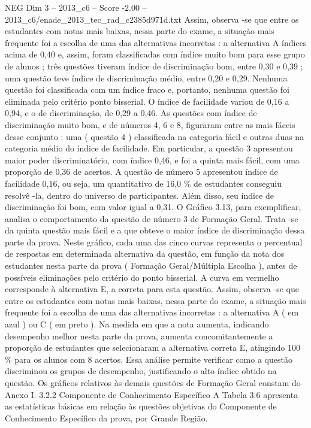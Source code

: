 \begin{textsample}{NEG Dim 3 – 2013\_c6 – Score -2.00 – 2013\_c6/enade\_2013\_tec\_rad\_c2385d971d.txt}
Assim, observa -se que entre os estudantes com notas mais baixas, nessa parte do exame, a situação mais frequente foi a escolha de uma das alternativas incorretas : a alternativa A índices acima de 0,40 e, assim, foram classificadas com índice muito bom para esse grupo de alunos ; três questões tiveram índice de discriminação bom, entre 0,30 e 0,39 ; uma questão teve índice de discriminação médio, entre 0,20 e 0,29.
Nenhuma questão foi classificada com um índice fraco e, portanto, nenhuma questão foi eliminada pelo critério ponto bisserial.
O índice de facilidade variou de 0,16 a 0,94, e o de discriminação, de 0,29 a 0,46.
As questões com índice de discriminação muito bom, e de números 4, 6 e 8, figuraram entre as mais fáceis desse conjunto : uma ( questão 4 ) classificada na categoria fácil e outras duas na categoria médio do índice de facilidade.
Em particular, a questão 3 apresentou maior poder discriminatório, com índice 0,46, e foi a quinta mais fácil, com uma proporção de 0,36 de acertos.
A questão de número 5 apresentou índice de facilidade 0,16, ou seja, um quantitativo de 16,0 \% de estudantes conseguiu resolvê -la, dentro do universo de participantes.
Além disso, seu índice de discriminação foi bom, com valor igual a 0,31.
O Gráfico 3.13, para exemplificar, analisa o comportamento da questão de número 3 de Formação Geral.
Trata -se da quinta questão mais fácil e a que obteve o maior índice de discriminação dessa parte da prova.
Neste gráfico, cada uma das cinco curvas representa o percentual de respostas em determinada alternativa da questão, em função da nota dos estudantes nesta parte da prova ( Formação Geral/Múltipla Escolha ), antes de possíveis eliminações pelo critério do ponto bisserial.
A curva em vermelho corresponde à alternativa E, a correta para esta questão.
Assim, observa -se que entre os estudantes com notas mais baixas, nessa parte do exame, a situação mais frequente foi a escolha de uma das alternativas incorretas : a alternativa A ( em azul ) ou C ( em preto ).
Na medida em que a nota aumenta, indicando desempenho melhor nesta parte da prova, aumenta concomitantemente a proporção de estudantes que selecionaram a alternativa correta E, atingindo 100 \% para os alunos com 8 acertos.
Essa análise permite verificar como a questão discriminou os grupos de desempenho, justificando o alto índice obtido na questão.
Os gráficos relativos às demais questões de Formação Geral constam do Anexo I. 3.2.2 Componente de Conhecimento Específico A Tabela 3.6 apresenta as estatísticas básicas em relação às questões objetivas do Componente de Conhecimento Específico da prova, por Grande Região.

\end{textsample}
